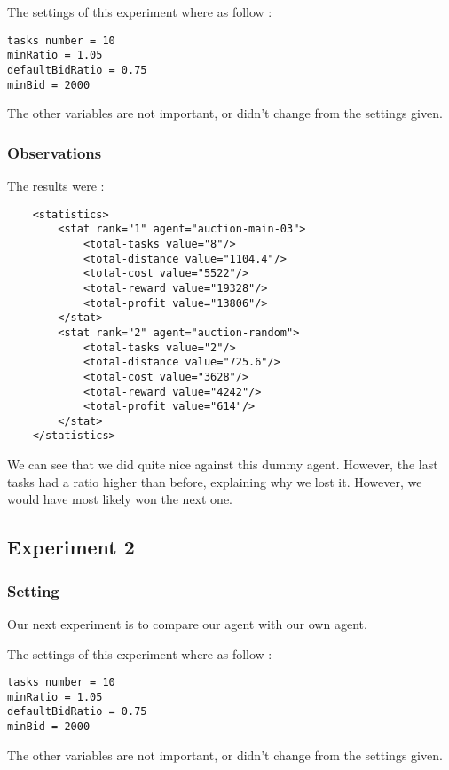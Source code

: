 \documentclass[11pt]{article}
\begin{document}
The settings of this experiment where as follow :

\begin{lstlisting}
tasks number = 10
minRatio = 1.05
defaultBidRatio = 0.75
minBid = 2000
\end{lstlisting}

The other variables are not important, or didn't change from the settings given.

\subsubsection{Observations}
The results were :

\begin{lstlisting}
	<statistics>
		<stat rank="1" agent="auction-main-03">
			<total-tasks value="8"/>
			<total-distance value="1104.4"/>
			<total-cost value="5522"/>
			<total-reward value="19328"/>
			<total-profit value="13806"/>
		</stat>
		<stat rank="2" agent="auction-random">
			<total-tasks value="2"/>
			<total-distance value="725.6"/>
			<total-cost value="3628"/>
			<total-reward value="4242"/>
			<total-profit value="614"/>
		</stat>
	</statistics>
\end{lstlisting}

We can see that we did quite nice against this dummy agent. However, the last tasks had a ratio higher than before, explaining why we lost it. However, we would have most likely won the next one.

\subsection{Experiment 2}

\subsubsection{Setting}

Our next experiment is to compare our agent with our own agent.

The settings of this experiment where as follow :

\begin{lstlisting}
tasks number = 10
minRatio = 1.05
defaultBidRatio = 0.75
minBid = 2000
\end{lstlisting}

The other variables are not important, or didn't change from the settings given.
\end{document}
